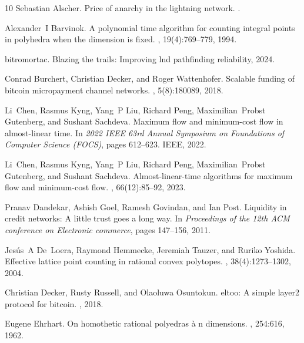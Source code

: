 \documentclass[10pt,twocolumn]{article}
\begin{document}
\begin{thebibliography}{10}
Sebastian Alscher.
\newblock Price of anarchy in the lightning network.
.

Alexander~I Barvinok.
\newblock A polynomial time algorithm for counting integral points in polyhedra
  when the dimension is fixed.
, 19(4):769--779, 1994.

bitromortac.
\newblock Blazing the trails: Improving lnd pathfinding reliability, 2024.

Conrad Burchert, Christian Decker, and Roger Wattenhofer.
\newblock Scalable funding of bitcoin micropayment channel networks.
, 5(8):180089, 2018.

Li~Chen, Rasmus Kyng, Yang~P Liu, Richard Peng, Maximilian~Probst Gutenberg,
  and Sushant Sachdeva.
\newblock Maximum flow and minimum-cost flow in almost-linear time.
\newblock In {\em 2022 IEEE 63rd Annual Symposium on Foundations of Computer
  Science (FOCS)}, pages 612--623. IEEE, 2022.

Li~Chen, Rasmus Kyng, Yang~P Liu, Richard Peng, Maximilian~Probst Gutenberg,
  and Sushant Sachdeva.
\newblock Almost-linear-time algorithms for maximum flow and minimum-cost flow.
, 66(12):85--92, 2023.

Pranav Dandekar, Ashish Goel, Ramesh Govindan, and Ian Post.
\newblock Liquidity in credit networks: A little trust goes a long way.
\newblock In {\em Proceedings of the 12th ACM conference on Electronic
  commerce}, pages 147--156, 2011.

Jes{\'u}s~A De~Loera, Raymond Hemmecke, Jeremiah Tauzer, and Ruriko Yoshida.
\newblock Effective lattice point counting in rational convex polytopes.
, 38(4):1273--1302, 2004.

Christian Decker, Rusty Russell, and Olaoluwa Osuntokun.
\newblock eltoo: A simple layer2 protocol for bitcoin.
, 2018.

Eugene Ehrhart.
\newblock On homothetic rational poly{e}dras {\`a} n dimensions.
, 254:616, 1962.


\end{thebibliography}
\end{document}
